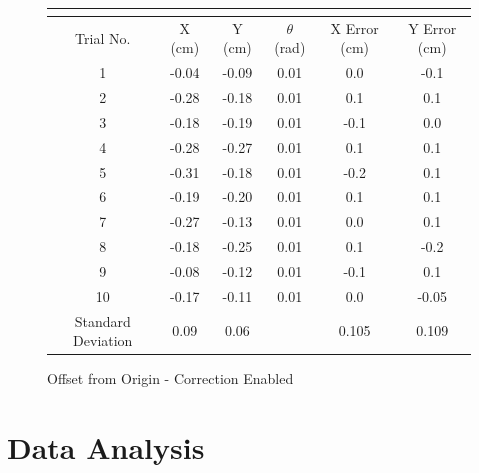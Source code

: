 \documentclass[11pt]{article} %
\begin{document}
\begin{figure}[h]
\begin{center}
\caption{Offset from Origin - Correction Enabled}
\begin{tabular}{ | c | c | c | c | c | c |}
\multicolumn{4}{c}{} \\ \hline
Trial No. & X (cm) & Y (cm) & $\theta$ (rad) & X Error (cm) & Y Error (cm)\\ \hline
1 & -0.04 & -0.09 & 0.01 & 0.0 & -0.1\\ \hline
2 & -0.28 & -0.18 & 0.01 & 0.1 & 0.1\\ \hline
3 & -0.18 & -0.19 & 0.01 & -0.1 & 0.0\\ \hline
4 & -0.28 & -0.27 & 0.01 & 0.1 & 0.1\\ \hline
5 & -0.31 & -0.18 & 0.01 & -0.2 & 0.1\\ \hline
6 & -0.19 & -0.20 & 0.01 & 0.1 & 0.1\\ \hline
7 & -0.27 & -0.13 & 0.01 & 0.0 & 0.1\\ \hline
8 & -0.18 & -0.25 & 0.01 & 0.1 & -0.2\\ \hline
9 & -0.08 & -0.12 & 0.01 & -0.1 & 0.1\\ \hline
10 & -0.17 & -0.11 & 0.01 & 0.0 & -0.05\\ \hline
Standard Deviation & 0.09 & 0.06 & & 0.105 & 0.109\\ \hline
\end{tabular}
\end{center}
\end{figure}

\section{Data Analysis}
\end{document}
